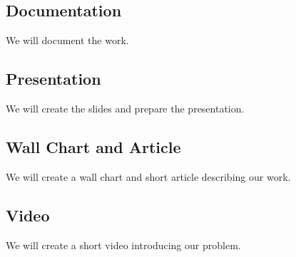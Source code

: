 \subsection{Documentation}\label{subsec:source-code-documentation}
We will document the work.

\subsection{Presentation}\label{subsec:presentation}
We will create the slides and prepare the presentation.

\subsection{Wall Chart and Article}\label{subsec:wall-chart-and-article}
We will create a wall chart and short article describing our work.

\subsection{Video}\label{subsec:video}
We will create a short video introducing our problem.